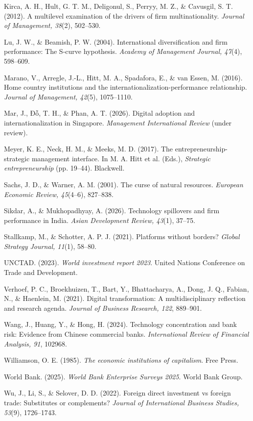 \documentclass[12pt,a4paper]{article}
\begin{document}
Kirca, A. H., Hult, G. T. M., Deligonul, S., Perryy, M. Z., \& Cavusgil,
S. T. (2012). A multilevel examination of the drivers of firm
multinationality. \emph{Journal of Management, 38}(2), 502--530.

Lu, J. W., \& Beamish, P. W. (2004). International diversification and
firm performance: The S-curve hypothesis. \emph{Academy of Management
Journal, 47}(4), 598--609.

Marano, V., Arregle, J.-L., Hitt, M. A., Spadafora, E., \& van Essen, M.
(2016). Home country institutions and the
internationalization-performance relationship. \emph{Journal of
Management, 42}(5), 1075--1110.

Mar, J., Đỗ, T. H., \& Phan, A. T. (2026). Digital adoption and
internationalization in Singapore. \emph{Management International
Review} (under review).

Meyer, K. E., Neck, H. M., \& Meeks, M. D. (2017). The
entrepreneurship-strategic management interface. In M. A. Hitt et al.
(Eds.), \emph{Strategic entrepreneurship} (pp. 19--44). Blackwell.

Sachs, J. D., \& Warner, A. M. (2001). The curse of natural resources.
\emph{European Economic Review, 45}(4--6), 827--838.

Sikdar, A., \& Mukhopadhyay, A. (2026). Technology spillovers and firm
performance in India. \emph{Asian Development Review, 43}(1), 37--75.

Stallkamp, M., \& Schotter, A. P. J. (2021). Platforms without borders?
\emph{Global Strategy Journal, 11}(1), 58--80.

UNCTAD. (2023). \emph{World investment report 2023}. United Nations
Conference on Trade and Development.

Verhoef, P. C., Broekhuizen, T., Bart, Y., Bhattacharya, A., Dong, J.
Q., Fabian, N., \& Haenlein, M. (2021). Digital transformation: A
multidisciplinary reflection and research agenda. \emph{Journal of
Business Research, 122}, 889--901.

Wang, J., Huang, Y., \& Hong, H. (2024). Technology concentration and
bank risk: Evidence from Chinese commercial banks. \emph{International
Review of Financial Analysis, 91}, 102968.

Williamson, O. E. (1985). \emph{The economic institutions of
capitalism}. Free Press.

World Bank. (2025). \emph{World Bank Enterprise Surveys 2025}. World
Bank Group.

Wu, J., Li, S., \& Selover, D. D. (2022). Foreign direct investment vs
foreign trade: Substitutes or complements? \emph{Journal of
International Business Studies, 53}(9), 1726--1743.
\end{document}
